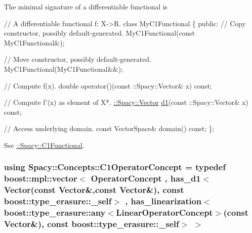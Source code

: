 \label{group__ConceptGroup_ga205b55d8291e0f2e143f116cf78bc54f_C1FunctionalConceptAnchor}%
\hypertarget{group__ConceptGroup_ga205b55d8291e0f2e143f116cf78bc54f_C1FunctionalConceptAnchor}{}%
The minimal signature of a differentiable functional is 
\begin{DoxyCode}
\textcolor{comment}{// A differentiable functional f: X->R.}
\textcolor{keyword}{class }MyC1Functional
\{
\textcolor{keyword}{public}:
  \textcolor{comment}{// Copy constructor, possibly default-generated.}
  MyC1Functional(\textcolor{keyword}{const} MyC1Functional&);

  \textcolor{comment}{// Move constructor, possibly default-generated.}
  MyC1Functional(MyC1Functional&&);

  \textcolor{comment}{// Compute f(x).}
  \textcolor{keywordtype}{double} operator()(const ::Spacy::Vector& x) \textcolor{keyword}{const};

  \textcolor{comment}{// Compute f'(x) as element of X*.}
  \hyperlink{classSpacy_1_1Vector}{::Spacy::Vector} \hyperlink{group__SpacyGroup_gab6646eb7068eb9f1369e639cf0b620a2_gab6646eb7068eb9f1369e639cf0b620a2}{d1}(const ::Spacy::Vector& x) \textcolor{keyword}{const};

  \textcolor{comment}{// Access underlying domain.}
  \textcolor{keyword}{const} VectorSpace& domain() \textcolor{keyword}{const};
\};
\end{DoxyCode}


See \hyperlink{group__SpacyGroup_gaa7cb8ef6c287b0af0352d3dd0eb9f200_C1FunctionalAnchor}{\+:\+:Spacy\+:\+:C1\+Functional}. \hypertarget{group__ConceptGroup_ga14a12c741dc237e32862fa4bc315451b_ga14a12c741dc237e32862fa4bc315451b}{}
\subsubsection[{C1\+Operator\+Concept}]{\setlength{\rightskip}{0pt plus 5cm}using {\bf Spacy\+::\+Concepts\+::\+C1\+Operator\+Concept} = typedef boost\+::mpl\+::vector$<$ Operator\+Concept , has\+\_\+d1$<$Vector(const Vector\&,const Vector\&), const boost\+::type\+\_\+erasure\+::\+\_\+self$>$ , has\+\_\+linearization$<$boost\+::type\+\_\+erasure\+::any$<$Linear\+Operator\+Concept$>$(const Vector\&), const boost\+::type\+\_\+erasure\+::\+\_\+self$>$ $>$}\label{group__ConceptGroup_ga14a12c741dc237e32862fa4bc315451b_ga14a12c741dc237e32862fa4bc315451b}


